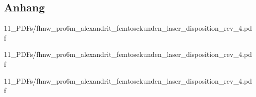 \begin{appendix} %
\section{Anhang}


{11_PDFs/fhnw_pro6m_alexandrit_femtosekunden_laser_disposition_rev_4.pdf}


{11_PDFs/fhnw_pro6m_alexandrit_femtosekunden_laser_disposition_rev_4.pdf}


{11_PDFs/fhnw_pro6m_alexandrit_femtosekunden_laser_disposition_rev_4.pdf}


\end{appendix}
